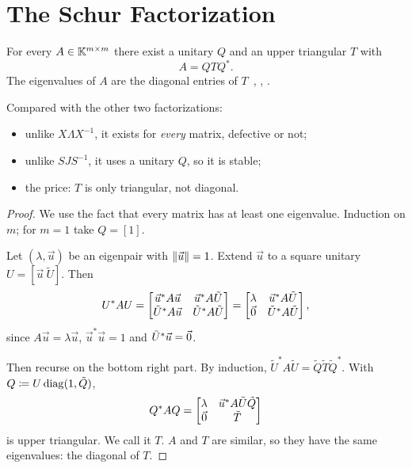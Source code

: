 \clearpage
\section{The Schur Factorization}
\label{sec:schur-fact}

\begin{theorem}
  \label{thm:schur}
  For every $A \in \mathbb{K}^{m \times m}$ there exist a unitary $Q$ and an upper triangular $T$ with
  \begin{equation}
    A = QTQ^\ast.
  \end{equation}
  The eigenvalues of $A$ are the diagonal entries of $T$~\cite[Thm.~24.9]{TB}, \cite[Thm.~4.2]{Demmel}, \cite[6.38]{Axler}.
\end{theorem}

Compared with the other two factorizations:
\begin{itemize}
  \item unlike $X\Lambda X^{-1}$, it exists for \emph{every} matrix, defective or not;
  \item unlike $SJS^{-1}$, it uses a unitary $Q$, so it is stable;
  \item the price: $T$ is only triangular, not diagonal.
\end{itemize}

\begin{proof}
  We use the fact that every matrix has at least one eigenvalue. Induction on $m$; for $m = 1$ take $Q = [1]$.

  Let $(\lambda, \vec{u})$ be an eigenpair with $\left\lVert \vec{u} \right\rVert = 1$. Extend $\vec{u}$ to a square unitary $U = [\vec{u}\ \tilde{U}]$. Then
  \begin{equation}
    U^\ast AU = \begin{bmatrix} \vec{u}^\ast A\vec{u} & \vec{u}^\ast A\tilde{U} \\ \tilde{U}^\ast A\vec{u} & \tilde{U}^\ast A\tilde{U} \end{bmatrix} = \begin{bmatrix} \lambda & \vec{u}^\ast A\tilde{U} \\ \vec{0} & \tilde{U}^\ast A\tilde{U} \end{bmatrix},
  \end{equation}
  since $A\vec{u} = \lambda\vec{u}$, $\vec{u}^\ast\vec{u} = 1$ and $\tilde{U}^\ast\vec{u} = \vec{0}$.

  Then recurse on the bottom right part. By induction, $\tilde{U}^\ast A\tilde{U} = \tilde{Q}\tilde{T}\tilde{Q}^\ast$. With $Q \coloneqq U\operatorname{diag}(1, \tilde{Q})$,
  \begin{equation}
    Q^\ast AQ = \begin{bmatrix} \lambda & \vec{u}^\ast A\tilde{U}\tilde{Q} \\ \vec{0} & \tilde{T} \end{bmatrix}
  \end{equation}
  is upper triangular. We call it $T$. $A$ and $T$ are similar, so they have the same eigenvalues: the diagonal of $T$.
\end{proof}


